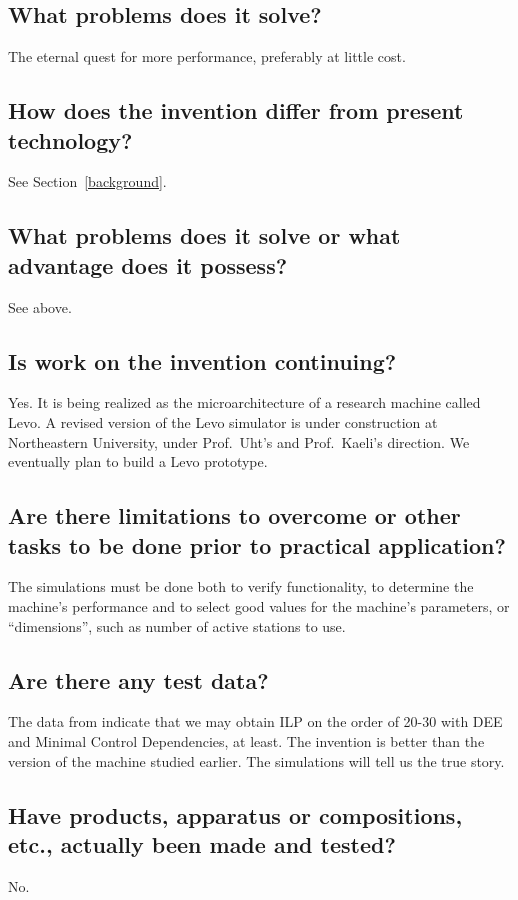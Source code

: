 \documentclass[10pt,dvips]{article}
\begin{document}
\subsection{What problems does it solve?}
The eternal quest for more performance, preferably at little cost.

\subsection{How does the invention differ from present technology?}
See Section~\ref{background}.

\subsection{What problems does it solve or what advantage does it possess?}
See above.

\subsection{Is work on the invention continuing?}
Yes. It is being realized as the microarchitecture of a research machine called Levo.
A revised version of the Levo simulator is under construction at Northeastern
University, under Prof.\ Uht's and Prof.\ Kaeli's direction.
We eventually plan to build a Levo prototype.

\subsection{Are there limitations to overcome or other tasks to be done prior to
practical application?}
The simulations must be done both to verify functionality, to determine the machine's
performance and to select good values for the machine's parameters, or ``dimensions'',
such as number of active stations to use.

\subsection{Are there any test data?}
The data from \cite{Uht95} indicate that we may obtain ILP on the order of 20-30
with DEE and Minimal Control Dependencies,
at least. The invention is better than the version of the machine studied earlier.
The simulations will tell us the true story.

\subsection{Have products, apparatus or compositions, etc., actually been made and tested?}
No.
\end{document}
